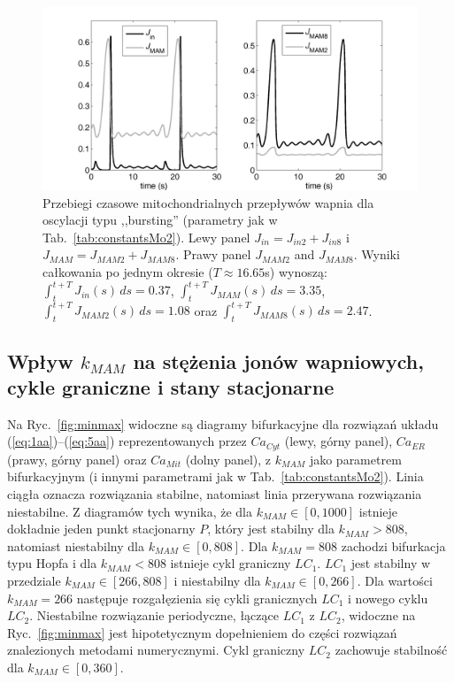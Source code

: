 \begin{figure}[ht]
    \centering
    \includegraphics[width=1\textwidth]{rysunki/rozdzial_5/bursting_flowsMo2}
    \caption[Przepływy mitochondrialne w Modelu \#2]{Przebiegi czasowe mitochondrialnych przepływów wapnia dla oscylacji typu ,,bursting'' (parametry jak w Tab.~\ref{tab:constantsMo2}). Lewy panel $J_{in} = J_{in2} + J_{in8}$ i~$J_{MAM} = J_{MAM2} + J_{MAM8}$. Prawy panel $J_{MAM2}$ and $J_{MAM8}$. Wyniki  całkowania  po jednym okresie ($T \approx 16.65$s) wynoszą: $\int_{t}^{t+T} J_{in}(s) \, ds = 0.37$, $\int_{t}^{t+T} J_{MAM}(s) \, ds = 3.35$, $\int_{t}^{t+T} J_{MAM2}(s) \, ds = 1.08$ oraz $\int_{t}^{t+T} J_{MAM8}(s) \, ds = 2.47$.}
    \label{fig:przeplywy2}
\end{figure}

\FloatBarrier
\subsection{Wpływ $k_{MAM}$ na stężenia jonów wapniowych, cykle graniczne  i stany stacjonarne}


Na Ryc.~\ref{fig:minmax} widoczne są diagramy bifurkacyjne dla rozwiązań układu (\ref{eq:1aa})--(\ref{eq:5aa}) reprezentowanych przez $Ca_{Cyt}$ (lewy, górny panel), $Ca_{ER}$ (prawy, górny panel) oraz $Ca_{Mit}$ (dolny panel), z $k_{MAM}$ jako parametrem bifurkacyjnym (i innymi parametrami jak w Tab.~\ref{tab:constantsMo2}). Linia ciągła oznacza rozwiązania stabilne, natomiast linia przerywana rozwiązania niestabilne. Z diagramów tych wynika, że dla $k_{MAM} \in [0,1000]$ istnieje dokładnie jeden punkt stacjonarny $P$, który jest stabilny dla $k_{MAM}>808$, natomiast niestabilny dla $k_{MAM}\in [0, 808]$. Dla $k_{MAM}=808$ zachodzi bifurkacja typu Hopfa i dla $k_{MAM}<808$ istnieje cykl graniczny $LC_1$. $LC_1$ jest stabilny w przedziale $k_{MAM} \in [266, 808]$ i niestabilny dla $k_{MAM} \in [0,266]$. Dla wartości $k_{MAM} = 266$ następuje rozgałęzienia się cykli granicznych $LC_1$ i nowego cyklu $LC_2$. Niestabilne rozwiązanie periodyczne, łączące $LC_1$ z $LC_2$, widoczne na Ryc.~\ref{fig:minmax} jest hipotetycznym dopełnieniem do części rozwiązań znalezionych metodami numerycznymi. Cykl graniczny $LC_2$ zachowuje stabilność dla $k_{MAM} \in [0,360]$. 

